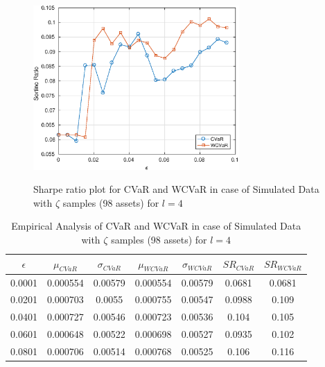 \documentclass[12pt]{article}
\numberwithin{equation}{section}
\begin{document}
\begin{figure}[!h]
    \centering
   
    \includegraphics[height=7.0cm,width=0.7\textwidth]{CVaR/bse100_simulated/sr_exact_4.eps}

   \caption{Sharpe ratio plot for CVaR and WCVaR in case of Simulated Data with $\zeta$ samples (98 assets) for $l=4$}
   \label{fig:6.5}
\end{figure}

\begin{table}[!h]
    \centering
    \captionsetup{justification=centering}

   \begin{tabular}{||c|c|c|c|c|c|c||}
   \hline
  
$\epsilon$ & $\mu_{CVaR}$ & $\sigma_{CVaR}$ & $\mu_{WCVaR}$ & $\sigma_{WCVaR}$ & $SR_{CVaR}$ & $SR_{WCVaR}$\\
  
  \hline
0.0001 & 0.000554 & 0.00579 & 0.000554 & 0.00579 & 0.0681 & 0.0681 \\
0.0201 & 0.000703 & 0.0055 & 0.000755 & 0.00547 & 0.0988 & 0.109 \\
0.0401 & 0.000727 & 0.00546 & 0.000723 & 0.00536 & 0.104 & 0.105 \\
0.0601 & 0.000648 & 0.00522 & 0.000698 & 0.00527 & 0.0935 & 0.102 \\
0.0801 & 0.000706 & 0.00514 & 0.000768 & 0.00525 & 0.106 & 0.116 \\
  \hline
\end{tabular}
    \caption{Empirical Analysis of CVaR and WCVaR in case of Simulated Data with $\zeta$ samples (98 assets) for $l=4$}
    \label{tab:6.5}
\end{table}
\end{document}
